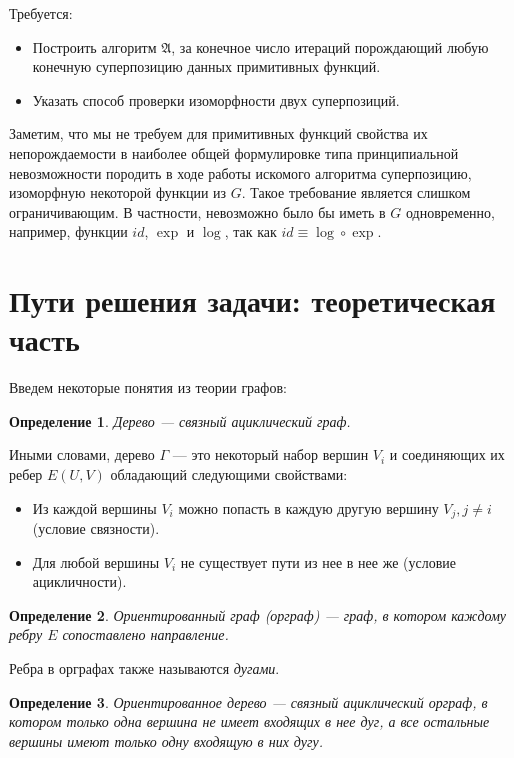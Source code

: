 \documentclass[12pt,a4paper]{amsart}
\newtheorem{defin}{Определение}
\begin{document}
Требуется:

\begin{itemize}
  \item Построить алгоритм $\mathfrak{A}$, за конечное число итераций
	порождающий любую конечную суперпозицию данных примитивных функций.
  \item Указать способ проверки изоморфности двух суперпозиций.
\end{itemize}

Заметим, что мы не требуем для примитивных функций свойства их
непорождаемости в наиболее общей формулировке типа принципиальной
невозможности породить в ходе работы искомого алгоритма суперпозицию,
изоморфную некоторой функции из $G$. Такое требование является слишком
ограничивающим. В частности, невозможно было бы иметь в $G$ одновременно,
например, функции $id$, $\exp$ и $\log$, так как
$id \equiv \log \circ \exp$.

\section{Пути решения задачи: теоретическая часть}

Введем некоторые понятия из теории графов:

\begin{defin}
  Дерево --- связный ациклический граф.
\end{defin}

Иными словами, дерево $\Gamma$ --- это некоторый набор вершин $V_i$ и
соединяющих их ребер $E(U, V)$ обладающий следующими свойствами:

\begin{itemize}
  \item Из каждой вершины $V_i$ можно попасть в каждую другую вершину
	$V_j, j \neq i$ (условие связности).
  \item Для любой вершины $V_i$ не существует пути из нее в нее же
	(условие ацикличности).
\end{itemize}

\begin{defin}
  Ориентированный граф (орграф) --- граф, в котором каждому ребру $E$
  сопоставлено направление.
\end{defin}

Ребра в орграфах также называются \emph{дугами}.

\begin{defin}
  Ориентированное дерево --- связный ациклический орграф, в котором
  только одна вершина не имеет входящих в нее дуг, а все остальные
  вершины имеют только одну входящую в них дугу.
\end{defin}
\end{document}
